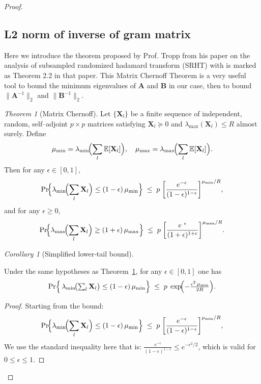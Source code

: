 \documentclass[11pt]{article}
\numberwithin{equation}{section}
\theoremstyle{plain}
\theoremstyle{definition}
\theoremstyle{remark}
\newtheorem{thm}[theorem]{Theorem}
\newtheorem{cor}[theorem]{Corollary}
\begin{document}
\begin{proof}
\subsection{L2 norm of inverse of gram matrix}
Here we introduce the theorem proposed by Prof. Tropp from his paper on the analysis of subsampled randomized hadamard transform (SRHT)\cite{tropp2011improvedanalysissubsampledrandomized} with is marked as Theorem 2.2 in that paper.
This Matrix Chernoff Theorem is a very useful tool to bound the minimum eigenvalues of \(\mathbf{A}\) and \(\mathbf{B}\) in our case, then to bound \(\|\mathbf{A}^{-1}\|_{2}\) and \(\|\mathbf{B}^{-1}\|_{2}\).
\begin{thm}[Matrix Chernoff]
  \label{thm:chernoff}
  Let \(\{\mathbf X_l\}\) be a finite sequence of independent, random,
    self–adjoint \(p\times p\) matrices satisfying
    \(\mathbf X_l\succeq0\) and \(\lambda_{\max}(\mathbf X_l)\le R\)
    almost surely.  Define
    \[
    \mu_{\min}
      =\lambda_{\min}\!\Bigl(\sum_l\mathbb E[\mathbf X_l]\Bigr),
    \quad
    \mu_{\max}
      =\lambda_{\max}\!\Bigl(\sum_l\mathbb E[\mathbf X_l]\Bigr).
    \]
    Then for any \(\epsilon\in[0,1]\),
    \[
    \Pr\!\Bigl\{
      \lambda_{\min}\!\Bigl(\sum_l\mathbf X_l\Bigr)\le (1-\epsilon)\,\mu_{\min}
    \Bigr\}
    \;\le\;
    p\;\biggl[\frac{e^{-\epsilon}}{(1-\epsilon)^{1-\epsilon}}\biggr]^{\mu_{\min}/R},
    \]
    and for any \(\epsilon\ge0\),
    \[
    \Pr\!\Bigl\{
      \lambda_{\max}\!\Bigl(\sum_l\mathbf X_l\Bigr)\ge (1+\epsilon)\,\mu_{\max}
    \Bigr\}
    \;\le\;
    p\;\biggl[\frac{e^{\ \epsilon}}{(1+\epsilon)^{1+\epsilon}}\biggr]^{\mu_{\max}/R}.
    \]
\end{thm}


  \begin{cor}[Simplified lower‐tail bound]
    \label{cor:simplified}

    Under the same hypotheses as Theorem~\ref{thm:chernoff}, for any \(\epsilon\in[0,1]\) one has
    \[
      \Pr\Bigl\{\,
        \lambda_{\min}\!\bigl(\textstyle\sum_{l}\mathbf{X}_l\bigr)
          \le (1-\epsilon)\,\mu_{\min}
        \Bigr\}
        \;\le\;
        p\;\exp\!\Bigl(-\tfrac{\epsilon^{2}\,\mu_{\min}}{2R}\Bigr).
    \]
  \end{cor}
    
    \begin{proof}
    Starting from the bound:
    \[
    \Pr\!\Bigl\{
      \lambda_{\min}\!\Bigl(\sum_l\mathbf X_l\Bigr)\le (1-\epsilon)\,\mu_{\min}
    \Bigr\}
    \;\le\;
    p\;\biggl[\frac{e^{-\epsilon}}{(1-\epsilon)^{1-\epsilon}}\biggr]^{\mu_{\min}/R},
    \]
    We use the standard inequality here that is:
    \(\tfrac{e^{-\epsilon}}{(1-\epsilon)^{1-\epsilon}}\le e^{-\epsilon^{2}/2}\),
    which is valid for \(0\le\epsilon\le1\).  
    

\end{proof}
\end{proof}
\end{document}
